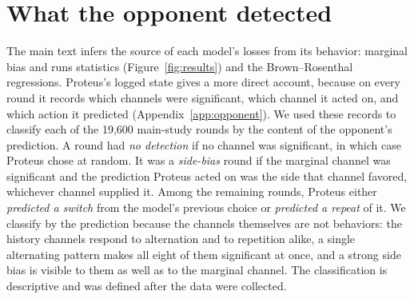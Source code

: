\section{What the opponent detected}\label{app:detection}

The main text infers the source of each model's losses from its behavior: marginal bias and runs statistics (Figure~\ref{fig:results}) and the Brown--Rosenthal regressions. Proteus's logged state gives a more direct account, because on every round it records which channels were significant, which channel it acted on, and which action it predicted (Appendix~\ref{app:opponent}). We used these records to classify each of the 19,600 main-study rounds by the content of the opponent's prediction. A round had \emph{no detection} if no channel was significant, in which case Proteus chose at random. It was a \emph{side-bias} round if the marginal channel was significant and the prediction Proteus acted on was the side that channel favored, whichever channel supplied it. Among the remaining rounds, Proteus either \emph{predicted a switch} from the model's previous choice or \emph{predicted a repeat} of it. We classify by the prediction because the channels themselves are not behaviors: the history channels respond to alternation and to repetition alike, a single alternating pattern makes all eight of them significant at once, and a strong side bias is visible to them as well as to the marginal channel. The classification is descriptive and was defined after the data were collected.

